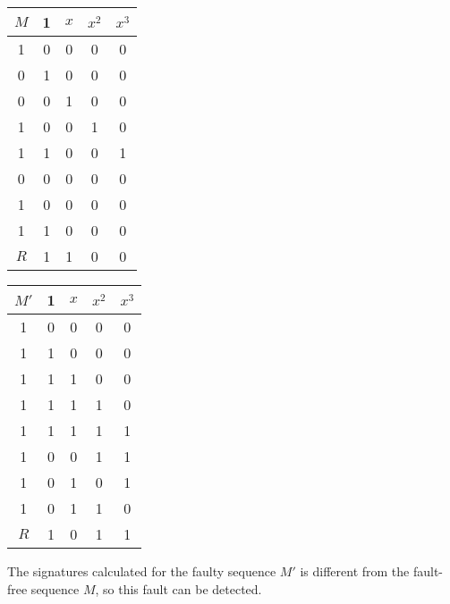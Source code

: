 \documentclass[a4paper,12pt]{article}
\begin{document}
\begin{enumerate}
            \begin{tabular}{|c|c|c|c|c|}
                \hline
                $M$ & 1 & $x$ & $x^2$ & $x^3$ \\ \hline
                1   & 0 & 0   & 0     & 0     \\ \hline
                0   & 1 & 0   & 0     & 0     \\ \hline
                0   & 0 & 1   & 0     & 0     \\ \hline
                1   & 0 & 0   & 1     & 0     \\ \hline
                1   & 1 & 0   & 0     & 1     \\ \hline
                0   & 0 & 0   & 0     & 0     \\ \hline
                1   & 0 & 0   & 0     & 0     \\ \hline
                1   & 1 & 0   & 0     & 0     \\ \hline
                $R$ & 1 & 1   & 0     & 0     \\ \hline
            \end{tabular}
            \begin{tabular}{|c|c|c|c|c|}
                \hline
                $M'$ & 1 & $x$ & $x^2$ & $x^3$ \\ \hline
                1    & 0 & 0   & 0     & 0     \\ \hline
                1    & 1 & 0   & 0     & 0     \\ \hline
                1    & 1 & 1   & 0     & 0     \\ \hline
                1    & 1 & 1   & 1     & 0     \\ \hline
                1    & 1 & 1   & 1     & 1     \\ \hline
                1    & 0 & 0   & 1     & 1     \\ \hline
                1    & 0 & 1   & 0     & 1     \\ \hline
                1    & 0 & 1   & 1     & 0     \\ \hline
                $R$  & 1 & 0   & 1     & 1     \\ \hline
            \end{tabular}

            The signatures calculated for the faulty sequence $M'$ is different from the fault-free sequence $M$, so this fault can be detected.

    \end{enumerate}
\end{document}
